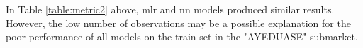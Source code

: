 \begin{sloppypar}
	\hspace*{-0.6cm}In Table \ref{table:metric2} above, \ac{mlr} and \ac{nn} models produced similar results. However, the low number of observations may be a possible explanation for the poor performance of all models on the train set in the "AYEDUASE" submarket.
	

\end{sloppypar}